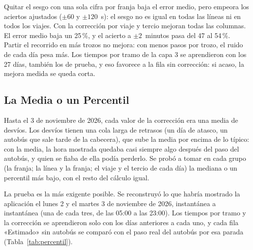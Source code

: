 Quitar el sesgo con una sola cifra por franja baja el error medio, pero empeora los aciertos ajustados ($\pm60$ y
$\pm120$~s): el sesgo no es igual en todas las líneas ni en todos los viajes. Con la corrección por viaje y tercio
mejoran todas las columnas. El error medio baja un 25\,\%, y el acierto a $\pm2$~minutos pasa del 47 al
54\,\%. Partir el recorrido en más trozos no mejora: con menos pasos por trozo, el ruido de cada día pesa más. Los
tiempos por tramo de la capa 3 se aprendieron con los 27 días, también los de prueba, y eso favorece a la fila sin
corrección: si acaso, la mejora medida se queda corta.

\subsection{La Media o un Percentil}
\label{sec:correccion-percentil}

Hasta el 3 de noviembre de 2026, cada valor de la corrección era una media de desvíos. Los desvíos tienen una cola
larga de retrasos (un día de atasco, un autobús que sale tarde de la cabecera), que sube la media por encima de lo
típico: con la media, la hora mostrada quedaba casi siempre algo después del paso del autobús, y quien se fiaba de ella
podía perderlo. Se probó a tomar en cada grupo (la franja; la línea y la franja; el viaje y el tercio de cada día) la
mediana o un percentil más bajo, con el resto del cálculo igual.

La prueba es la más exigente posible. Se reconstruyó lo que habría mostrado la aplicación el lunes 2 y el martes 3 de
noviembre de 2026, instantánea a instantánea (una de cada tres, de las 05:00 a las 23:00). Los tiempos por tramo y la corrección
se aprendieron solo con los días anteriores a cada uno, y cada fila «Estimado» sin autobús se comparó con el paso real
del autobús por esa parada (Tabla~\ref{tab:percentil}).

